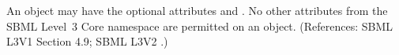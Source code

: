 An \AlgebraicRule object may have the optional attributes 
and .  No other attributes from the SBML Level~3 Core
namespace are permitted on an \AlgebraicRule object.  (References: SBML L3V1 Section 4.9; SBML
L3V2 .)
